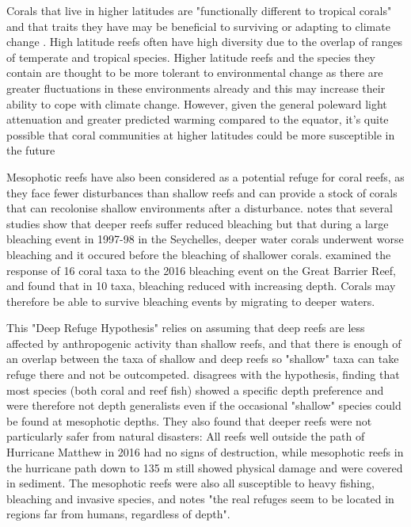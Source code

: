 \documentclass[11pt,a4paper]{article}
\begin{document}
 Corals that live in higher latitudes are "functionally different to tropical corals" and that traits they have may be beneficial to surviving or adapting to climate change \citep{Camp2018}. High latitude reefs often have high diversity due to the overlap of ranges of temperate and tropical species. %
Higher latitude reefs and the species they contain are thought to be more tolerant to environmental change as there are greater fluctuations in these environments already %
 and this may increase their ability to cope with climate change. However, given the general poleward light attenuation and greater predicted warming compared to the equator, it's quite possible that coral communities at higher latitudes could be more susceptible in the future %

Mesophotic reefs have also been considered as a potential refuge for coral reefs, as they face fewer disturbances than shallow reefs and can provide a stock of corals that can recolonise shallow environments after a disturbance. \cite{Camp2018} notes that several studies show that deeper reefs suffer reduced bleaching %
but that during a large bleaching event in 1997-98 in the Seychelles, deeper water corals underwent worse bleaching and it occured before the bleaching of shallower corals. \cite{Baird2018} examined the response of 16 coral taxa to the 2016 bleaching event on the Great Barrier Reef, and found that in 10 taxa, bleaching reduced with increasing depth. Corals may therefore be able to survive bleaching events by migrating to deeper waters. 

This "Deep Refuge Hypothesis" relies on assuming that deep reefs are less affected by anthropogenic activity than shallow reefs, and that there is enough of an overlap between the taxa of shallow and deep reefs so "shallow" taxa can take refuge there and not be outcompeted. \cite{Rocha2018} disagrees with the hypothesis, finding that most species (both coral and reef fish) showed a specific depth preference and were therefore not depth generalists even if the occasional "shallow" species could be found at mesophotic depths. They also found that deeper reefs were not particularly safer from natural disasters: All reefs well outside the path of Hurricane Matthew in 2016 had no signs of destruction, while mesophotic reefs in the hurricane path down to 135 m still showed physical damage and were covered in sediment. The mesophotic reefs were also all susceptible to heavy fishing, bleaching and invasive species, and \cite{Rocha2018} notes "the real refuges seem to be located in regions far from humans, regardless of depth".
\end{document}

